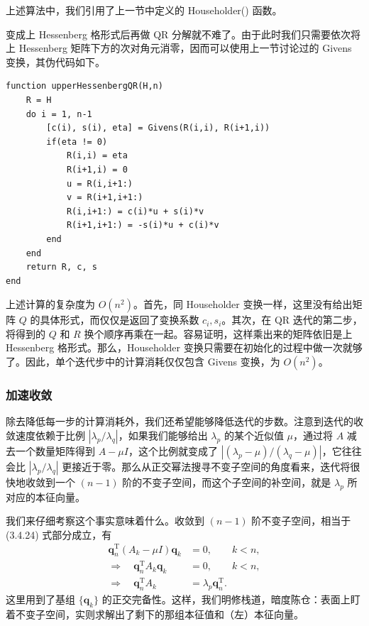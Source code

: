 上述算法中，我们引用了上一节中定义的 Householder() 函数。

变成上 Hessenberg 格形式后再做 QR 分解就不难了。由于此时我们只需要依次将上 Hessenberg 矩阵下方的次对角元消零，因而可以使用上一节讨论过的 Givens 变换，其伪代码如下。

\begin{algorithmBox}
\begin{lstlisting}[style=bellacode]
function upperHessenbergQR(H,n)
    R = H
    do i = 1, n-1
        [c(i), s(i), eta] = Givens(R(i,i), R(i+1,i))
        if(eta != 0)
            R(i,i) = eta
            R(i+1,i) = 0
            u = R(i,i+1:)
            v = R(i+1,i+1:)
            R(i,i+1:) = c(i)*u + s(i)*v
            R(i+1,i+1:) = -s(i)*u + c(i)*v
        end
    end
    return R, c, s
end
\end{lstlisting}
\end{algorithmBox}

上述计算的复杂度为 $O(n^2)$。首先，同 Householder 变换一样，这里没有给出矩阵 $Q$ 的具体形式，而仅仅是返回了变换系数 $c_i,s_i$。其次，在 QR 迭代的第二步，将得到的 $Q$ 和 $R$ 换个顺序再乘在一起。容易证明，这样乘出来的矩阵依旧是上 Hessenberg 格形式。那么，Householder 变换只需要在初始化的过程中做一次就够了。因此，单个迭代步中的计算消耗仅仅包含 Givens 变换，为 $O(n^2)$。

\subsubsection{加速收敛}

除去降低每一步的计算消耗外，我们还希望能够降低迭代的步数。注意到迭代的收敛速度依赖于比例 $|\lambda_p/\lambda_q|$，如果我们能够给出 $\lambda_p$ 的某个近似值 $\mu$，通过将 $A$ 减去一个数量矩阵得到 $A-\mu I$，这个比例就变成了 $|(\lambda_p-\mu)/(\lambda_q-\mu)|$，它往往会比 $|\lambda_p/\lambda_q|$ 更接近于零。那么从正交幂法搜寻不变子空间的角度看来，迭代将很快地收敛到一个 $(n-1)$ 阶的不变子空间，而这个子空间的补空间，就是 $\lambda_p$ 所对应的本征向量。

我们来仔细考察这个事实意味着什么。收敛到 $(n-1)$ 阶不变子空间，相当于 (3.4.24) 式部分成立，有
\begin{align}
\bm q_n^{\mathrm T}(A_k-\mu I)\bm q_k&=0,\qquad k<n,
\tag{3.4.27}\\
\Longrightarrow\quad \bm q_n^{\mathrm T}A_k\bm q_k&=0,\qquad k<n,
\tag{3.4.28}\\
\Longrightarrow\quad \bm q_n^{\mathrm T}A_k&=\lambda_p\bm q_n^{\mathrm T}.
\tag{3.4.29}
\end{align}
这里用到了基组 $\{\bm q_k\}$ 的正交完备性。这样，我们明修栈道，暗度陈仓：表面上盯着不变子空间，实则求解出了剩下的那组本征值和（左）本征向量。

